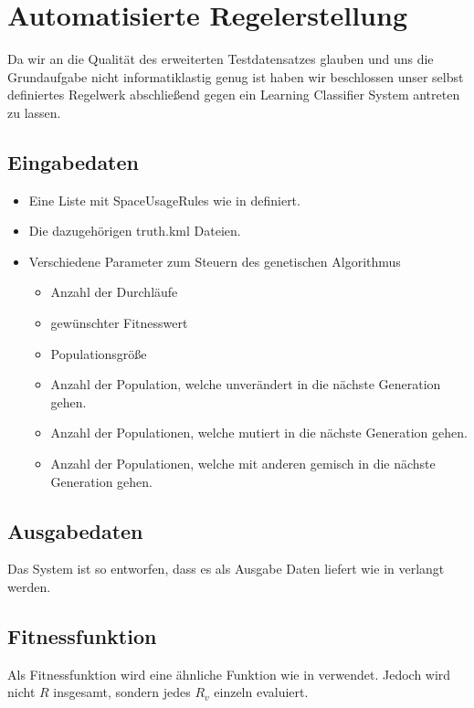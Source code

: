 \section{Automatisierte Regelerstellung}
Da wir an die Qualität des erweiterten Testdatensatzes glauben und uns die Grundaufgabe nicht informatiklastig genug ist
haben wir beschlossen unser selbst definiertes Regelwerk abschließend gegen ein Learning Classifier System antreten zu lassen.
\subsection{Eingabedaten}
\begin{itemize}
\item Eine Liste mit SpaceUsageRules wie in  definiert.
\item Die dazugehörigen truth.kml Dateien.
\item Verschiedene Parameter zum Steuern des genetischen Algorithmus \begin{itemize}
\item Anzahl der Durchläufe
\item gewünschter Fitnesswert
\item Populationsgröße
\item Anzahl der Population, welche unverändert in die nächste Generation gehen.
\item Anzahl der Populationen, welche mutiert in die nächste Generation gehen.
\item Anzahl der Populationen, welche mit anderen gemisch in die nächste Generation gehen.
\end{itemize}
\end{itemize}
\subsection{Ausgabedaten}
Das System ist so entworfen, dass es als Ausgabe Daten liefert wie in  verlangt werden.
\subsection{Fitnessfunktion}
Als Fitnessfunktion wird eine ähnliche Funktion wie in  verwendet. Jedoch wird nicht $R$ insgesamt, sondern jedes $R_v$ einzeln evaluiert.
